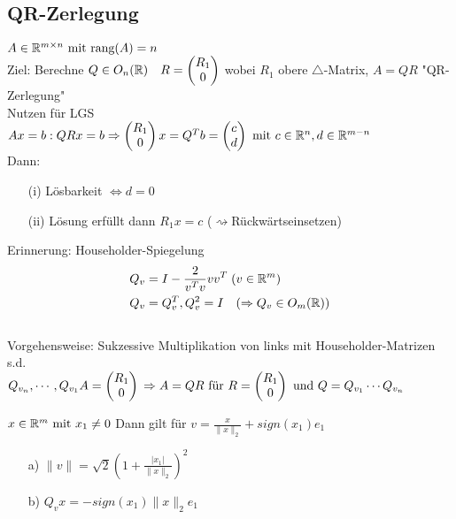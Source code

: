 \subsection{QR-Zerlegung}
$A \in \mathbb R^{m \times n} \text{ mit rang}(A) = n$\\
\newline
Ziel: Berechne $Q \in O_n(\mathbb R)\quad
				R=\begin{pmatrix}
				R_1\\0
				\end{pmatrix}$ wobei $R_1$ obere $\triangle$-Matrix,
				$A=QR$ "QR-Zerlegung"\\
\newline
Nutzen für LGS $Ax=b: QRx = b\\ \Rightarrow \begin{pmatrix} R_1\\0\end{pmatrix}x= Q^Tb = \begin{pmatrix}c\\d\end{pmatrix} \text{ mit } c\in \mathbb R^n, d \in \mathbb R^{m-n}$\\
\newline
Dann: \begin{itemize}
	\item[(i)]Lösbarkeit $\Leftrightarrow d=0$
	\item[(ii)]Lösung erfüllt dann $R_1x=c$ ($\rightsquigarrow$Rückwärtseinsetzen)
\end{itemize}
Erinnerung: Householder-Spiegelung
\begin{align*}
&Q_v=I -\frac{2}{v^Tv}vv^T \;(v\in\mathbb R^m)\\
&Q_v=Q_v^T, Q_v^2=I \quad (\Rightarrow Q_v \in O_m(\mathbb R))
\end{align*}\\
Vorgehensweise: Sukzessive Multiplikation von links mit Householder-Matrizen s.d.\\ $ Q_{v_n}, \cdots, Q_{v_1} A =\begin{pmatrix}R_1\\0\end{pmatrix}\\
\Rightarrow A =QR \text{ für } R= \begin{pmatrix}R_1\\0\end{pmatrix} \text{ und } Q=Q_{v_1} \cdots Q_{v_n} $
\begin{Lemma}
	$x \in \mathbb R^m \text{ mit } x_1 \neq 0$
	\newline Dann gilt für $v = \frac{x}{\|x\|_2}+sign(x_1)e_1$
	\begin{itemize}
		\item[a)]$\|v\|=\sqrt{2}\left(1+\frac{|x_1|}{\|x\|_2}\right)^2$
		\item[b)]$Q_vx=-sign(x_1)\|x\|_2e_1$
	\end{itemize}
\end{Lemma}
